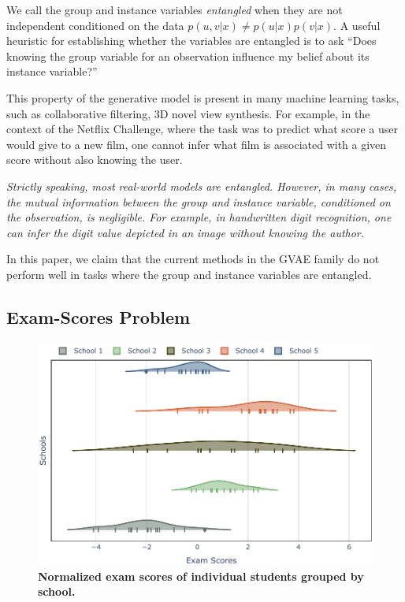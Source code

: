 \documentclass[nohyperref]{article}
\theoremstyle{plain}
\theoremstyle{definition}
\theoremstyle{remark}
\begin{document}
We call the group and instance variables \textit{entangled} when they are not independent conditioned on the data $p(u, v | x) \neq p(u | x) p(v | x)$. A useful heuristic for establishing whether the variables are entangled is to ask ``Does knowing the group variable for an observation influence my belief about its instance variable?''

This property of the generative model is present in many machine learning tasks, such as collaborative filtering, 3D novel view synthesis. For example, in the context of the Netflix Challenge, where the task was to predict what score a user would give to a new film, one cannot infer what film is associated with a given score without also knowing the user.

\textit{Strictly speaking, most real-world models are entangled. However, in many cases, the mutual information between the group and instance variable, conditioned on the observation, is negligible. For example, in handwritten digit recognition, one can infer the digit value depicted in an image without knowing the author.}

In this paper, we claim that the current methods in the GVAE family do not perform well in tasks where the group and instance variables are entangled.

\subsection{Exam-Scores Problem}

\begin{figure}[ht]
    \vskip 0.2in
    \begin{center}
    \centerline{\includegraphics[width=\columnwidth]{files/data.pdf}}
    \caption{\textbf{Normalized exam scores of individual students grouped by school.}}
    \label{exam-score}
    \end{center}
    \vskip -0.2in
\end{figure}
\end{document}

